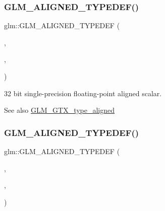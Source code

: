 \subsubsection{\texorpdfstring{G\+L\+M\+\_\+\+A\+L\+I\+G\+N\+E\+D\+\_\+\+T\+Y\+P\+E\+D\+E\+F()}{GLM\_ALIGNED\_TYPEDEF()}\hspace{0.1cm}{\footnotesize\ttfamily [139/209]}}
{\footnotesize\ttfamily glm\+::\+G\+L\+M\+\_\+\+A\+L\+I\+G\+N\+E\+D\+\_\+\+T\+Y\+P\+E\+D\+EF (\begin{DoxyParamCaption}\item[{\hyperlink{group__gtc__type__precision_ga642737ae3e7c434b366f2191e6944bf2}{float32\+\_\+t}}]{,  }\item[{aligned\+\_\+float32\+\_\+t}]{,  }\item[{4}]{ }\end{DoxyParamCaption})}

32 bit single-\/precision floating-\/point aligned scalar. \begin{DoxySeeAlso}{See also}
\hyperlink{group__gtx__type__aligned}{G\+L\+M\+\_\+\+G\+T\+X\+\_\+type\+\_\+aligned} 
\end{DoxySeeAlso}
\mbox{\label{group__gtx__type__aligned_ga6e3a2d83b131336219a0f4c7cbba2a48}} 
\subsubsection{\texorpdfstring{G\+L\+M\+\_\+\+A\+L\+I\+G\+N\+E\+D\+\_\+\+T\+Y\+P\+E\+D\+E\+F()}{GLM\_ALIGNED\_TYPEDEF()}\hspace{0.1cm}{\footnotesize\ttfamily [140/209]}}
{\footnotesize\ttfamily glm\+::\+G\+L\+M\+\_\+\+A\+L\+I\+G\+N\+E\+D\+\_\+\+T\+Y\+P\+E\+D\+EF (\begin{DoxyParamCaption}\item[{\hyperlink{group__gtc__type__precision_gade966a3eb25ebeb16dd53c40d3fdeb46}{float64\+\_\+t}}]{,  }\item[{aligned\+\_\+float64\+\_\+t}]{,  }\item[{8}]{ }\end{DoxyParamCaption})}

